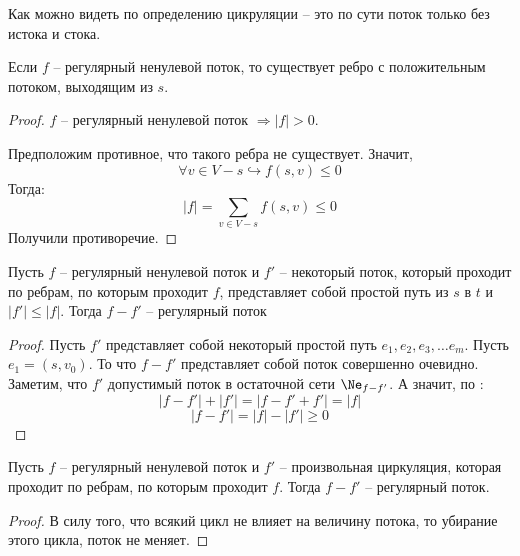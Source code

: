\Note Как можно видеть по определению цикруляции -- это по сути поток только без истока и стока.

 Если $f$ -- регулярный ненулевой поток, то существует ребро с положительным потоком, выходящим из $s$.
\begin{proof}
    
    $f$ -- регулярный ненулевой поток $\Rightarrow |f| > 0$.

    Предположим противное, что такого ребра не существует. Значит,
    \begin{equation*}
        \forall v \in V - s \hookrightarrow f(s, v) \leq 0
    \end{equation*}
    Тогда:
    \begin{equation*}
        |f| = \sum\limits_{v \in V - s} f(s, v) \leq 0
    \end{equation*}
    Получили противоречие.

\end{proof}

 Пусть $f$ -- регулярный ненулевой поток и $f'$ -- некоторый поток, который проходит по ребрам, по которым проходит $f$, представляет собой простой путь из $s$ в $t$ и $|f'| \leq |f|$. Тогда $f - f'$ -- регулярный поток
\begin{proof}
    
    Пусть $f'$ представляет собой некоторый простой путь $e_1, e_2, e_3, \dots e_m$. Пусть $e_1 = (s, v_0)$. То что $f - f'$ представляет собой поток совершенно очевидно. Заметим, что $f'$ допустимый поток в остаточной сети $\Ne_{f - f'}$. А значит, по :
    \begin{equation*}
        |f - f'| + |f'| = |f - f' + f'| = |f|
    \end{equation*}
    \begin{equation*}
        |f - f'| = |f| - |f'| \geq 0
    \end{equation*}
\end{proof}

 Пусть $f$ -- регулярный ненулевой поток и $f'$ -- произвольная циркуляция, которая проходит по ребрам, по которым проходит $f$. Тогда $f - f'$ -- регулярный поток.
\begin{proof}
    В силу того, что всякий цикл не влияет на величину потока, то убирание этого цикла, поток не меняет.
\end{proof}


